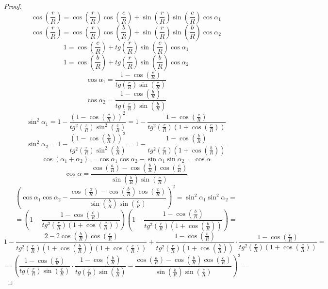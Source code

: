 \documentclass[12pt]{article}
\theoremstyle{plain}
\begin{document}
    \begin{proof}
        $$\cos\left(\frac{r}{R}\right)=\cos\left(\frac{r}{R}\right)\cos\left(\frac{c}{R}\right)+\sin\left(\frac{r}{R}\right)\sin\left(\frac{c}{R}\right)\cos\alpha_1$$
        $$\cos\left(\frac{r}{R}\right)=\cos\left(\frac{r}{R}\right)\cos\left(\frac{b}{R}\right)+\sin\left(\frac{r}{R}\right)\sin\left(\frac{b}{R}\right)\cos\alpha_2$$
        $$1=\cos\left(\frac{c}{R}\right)+tg\left(\frac{r}{R}\right)\sin\left(\frac{c}{R}\right)\cos\alpha_1$$
        $$1=\cos\left(\frac{b}{R}\right)+tg\left(\frac{r}{R}\right)\sin\left(\frac{b}{R}\right)\cos\alpha_2$$
        $$\cos\alpha_1=\frac{1-\cos\left(\frac{c}{R}\right)}{tg\left(\frac{r}{R}\right)\sin\left(\frac{c}{R}\right)}$$
        $$\cos\alpha_2=\frac{1-\cos\left(\frac{b}{R}\right)}{tg\left(\frac{r}{R}\right)\sin\left(\frac{b}{R}\right)}$$
        $$\sin^2\alpha_1=1-\frac{\left(1-\cos\left(\frac{c}{R}\right)\right)^2}{tg^2\left(\frac{r}{R}\right)\sin^2\left(\frac{c}{R}\right)}=1-\frac{1-\cos\left(\frac{c}{R}\right)}{tg^2\left(\frac{r}{R}\right)\left(1+\cos\left(\frac{c}{R}\right)\right)}$$
        $$\sin^2\alpha_2=1-\frac{\left(1-\cos\left(\frac{b}{R}\right)\right)^2}{tg^2\left(\frac{r}{R}\right)\sin^2\left(\frac{b}{R}\right)}=1-\frac{1-\cos\left(\frac{b}{R}\right)}{tg^2\left(\frac{r}{R}\right)\left(1+\cos\left(\frac{b}{R}\right)\right)}$$
        $$\cos(\alpha_1+\alpha_2)=\cos\alpha_1\cos\alpha_2-\sin\alpha_1\sin\alpha_2=\cos\alpha$$
        $$\cos\alpha=\frac{\cos\left(\frac{a}{R}\right)-\cos\left(\frac{b}{R}\right)\cos\left(\frac{c}{R}\right)}{\sin\left(\frac{b}{R}\right)\sin\left(\frac{c}{R}\right)}$$
        $$\left(\cos\alpha_1\cos\alpha_2-\frac{\cos\left(\frac{a}{R}\right)-\cos\left(\frac{b}{R}\right)\cos\left(\frac{c}{R}\right)}{\sin\left(\frac{b}{R}\right)\sin\left(\frac{c}{R}\right)}\right)^2=\sin^2\alpha_1\sin^2\alpha_2=$$
        $$=\left(1-\frac{1-\cos\left(\frac{c}{R}\right)}{tg^2\left(\frac{r}{R}\right)\left(1+\cos\left(\frac{c}{R}\right)\right)}\right)\left(1-\frac{1-\cos\left(\frac{b}{R}\right)}{tg^2\left(\frac{r}{R}\right)\left(1+\cos\left(\frac{b}{R}\right)\right)}\right)=$$
        $$1-\frac{2-2\cos\left(\frac{b}{R}\right)\cos\left(\frac{c}{R}\right)}{tg^2\left(\frac{r}{R}\right)\left(1+\cos\left(\frac{b}{R}\right)\right)\left(1+\cos\left(\frac{c}{R}\right)\right)}+\frac{1-\cos\left(\frac{b}{R}\right)}{tg^2\left(\frac{r}{R}\right)\left(1+\cos\left(\frac{b}{R}\right)\right)}\cdot\frac{1-\cos\left(\frac{c}{R}\right)}{tg^2\left(\frac{r}{R}\right)\left(1+\cos\left(\frac{c}{R}\right)\right)}=$$
        $$=\left(\frac{1-\cos\left(\frac{c}{R}\right)}{tg\left(\frac{r}{R}\right)\sin\left(\frac{c}{R}\right)}\cdot\frac{1-\cos\left(\frac{b}{R}\right)}{tg\left(\frac{r}{R}\right)\sin\left(\frac{b}{R}\right)}-\frac{\cos\left(\frac{a}{R}\right)-\cos\left(\frac{b}{R}\right)\cos\left(\frac{c}{R}\right)}{\sin\left(\frac{b}{R}\right)\sin\left(\frac{c}{R}\right)}\right)^2=$$

\end{proof}
\end{document}
